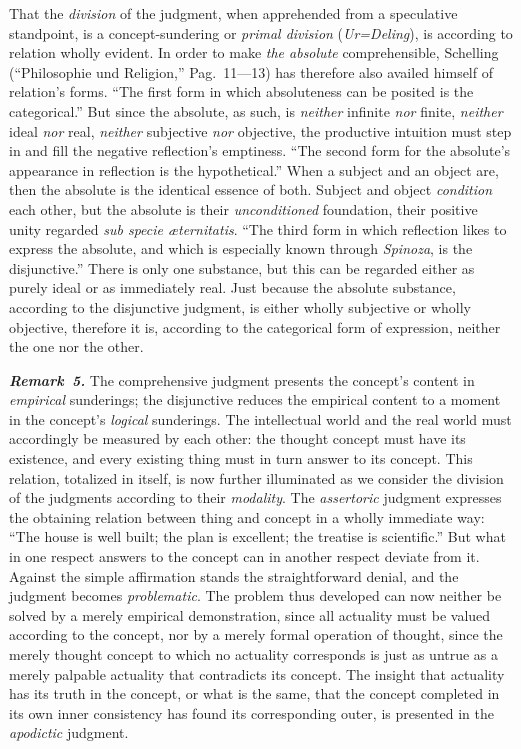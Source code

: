 \documentclass[12pt]{book}
\newcommand{\anm}[1]{\emph{\textbf{Remark~#1.}}}
\begin{document}
That the \emph{division} of the judgment, when apprehended from a
speculative standpoint, is a concept-sundering or \emph{primal division}
(\textit{Ur=Deling}), is according to relation wholly evident. In order to
make \emph{the absolute} comprehensible, Schelling (``Philosophie und
Religion,'' Pag.\ 11---13) has therefore also availed himself of relation's
forms. ``The first form in which absoluteness can be posited is the
categorical.'' But since the absolute, as such, is \emph{neither} infinite
\emph{nor} finite, \emph{neither} ideal \emph{nor} real, \emph{neither}
subjective \emph{nor} objective, the productive intuition must step in and
fill the negative reflection's emptiness. ``The second form for the
absolute's appearance in reflection is the hypothetical.'' When a subject
and an object are, then the absolute is the identical essence of both.
Subject and object \emph{condition} each other, but the absolute is their
\emph{unconditioned} foundation, their positive unity regarded \textit{sub
specie æternitatis}. ``The third form in which reflection likes to express
the absolute, and which is especially known through \emph{Spinoza}, is the
disjunctive.'' There is only one substance, but this can be regarded either
as purely ideal or as immediately real. Just because the absolute substance,
according to the disjunctive judgment, is either wholly subjective or wholly
objective, therefore it is, according to the categorical form of expression,
neither the one nor the other.

\anm{5} The comprehensive judgment presents the concept's content in
\emph{empirical} sunderings; the disjunctive reduces the empirical content
to a moment in the concept's \emph{logical} sunderings. The intellectual
world and the real world must accordingly be measured by each other: the
thought concept must have its existence, and every existing thing must in
turn answer to its concept. This relation, totalized in itself, is now
further illuminated as we consider the division of the judgments according
to their \emph{modality}. The \emph{assertoric} judgment expresses the
obtaining relation between thing and concept in a wholly immediate way:
``The house is well built; the plan is excellent; the treatise is
scientific.'' But what in one respect answers to the concept can in another
respect deviate from it. Against the simple affirmation stands the
straightforward denial, and the judgment becomes \emph{problematic}. The
problem thus developed can now neither be solved by a merely empirical
demonstration, since all actuality must be valued according to the concept,
nor by a merely formal operation of thought, since the merely thought
concept to which no actuality corresponds is just as untrue as a merely
palpable actuality that contradicts its concept. The insight that actuality
has its truth in the concept, or what is the same, that the concept
completed in its own inner consistency has found its corresponding outer, is
presented in the \emph{apodictic} judgment.
\end{document}
